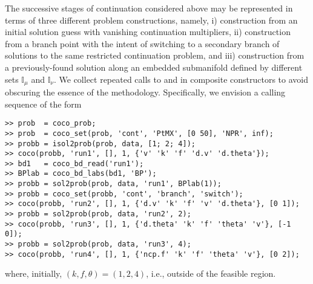 The successive stages of continuation considered above may be represented in terms of three different problem constructions, namely, i) construction from an initial solution guess with vanishing continuation multipliers, ii) construction from a branch point with the intent of switching to a secondary branch of solutions to the same restricted continuation problem, and iii) construction from a previously-found solution along an embedded submanifold defined by different sets $\mathbb{I}_\mu$ and $\mathbb{I}_\nu$. We collect repeated calls to  and  in composite constructors to avoid obscuring the essence of the methodology. Specifically, we envision a calling sequence of the form
\begin{lstlisting}[language=coco-highlight]
>> prob  = coco_prob;
>> prob  = coco_set(prob, 'cont', 'PtMX', [0 50], 'NPR', inf);
>> probb = isol2prob(prob, data, [1; 2; 4]);
>> coco(probb, 'run1', [], 1, {'v' 'k' 'f' 'd.v' 'd.theta'});
>> bd1   = coco_bd_read('run1');
>> BPlab = coco_bd_labs(bd1, 'BP');
>> probb = sol2prob(prob, data, 'run1', BPlab(1));
>> probb = coco_set(probb, 'cont', 'branch', 'switch');
>> coco(probb, 'run2', [], 1, {'d.v' 'k' 'f' 'v' 'd.theta'}, [0 1]);
>> probb = sol2prob(prob, data, 'run2', 2);
>> coco(probb, 'run3', [], 1, {'d.theta' 'k' 'f' 'theta' 'v'}, [-1 0]);
>> probb = sol2prob(prob, data, 'run3', 4);
>> coco(probb, 'run4', [], 1, {'ncp.f' 'k' 'f' 'theta' 'v'}, [0 2]);
\end{lstlisting}
where, initially, $(k,f,\theta)=(1,2,4)$, i.e., outside of the feasible region. 

